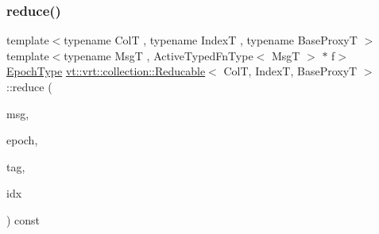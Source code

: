 \mbox{\label{structvt_1_1vrt_1_1collection_1_1_reducable_aac9bcd9f1bf69f13ab7b206580fc6969}} 
\subsubsection{\texorpdfstring{reduce()}{reduce()}\hspace{0.1cm}{\footnotesize\ttfamily [4/4]}}
{\footnotesize\ttfamily template$<$typename ColT , typename IndexT , typename Base\+ProxyT $>$ \\
template$<$typename MsgT , Active\+Typed\+Fn\+Type$<$ Msg\+T $>$ $\ast$ f$>$ \\
\hyperlink{namespacevt_a985a5adf291c34a3ca263b3378388236}{Epoch\+Type} \hyperlink{structvt_1_1vrt_1_1collection_1_1_reducable}{vt\+::vrt\+::collection\+::\+Reducable}$<$ ColT, IndexT, Base\+ProxyT $>$\+::reduce (\begin{DoxyParamCaption}\item[{MsgT $\ast$const}]{msg,  }\item[{\hyperlink{namespacevt_a985a5adf291c34a3ca263b3378388236}{Epoch\+Type} const \&}]{epoch,  }\item[{\hyperlink{namespacevt_a84ab281dae04a52a4b243d6bf62d0e52}{Tag\+Type} const \&}]{tag,  }\item[{IndexT const \&}]{idx }\end{DoxyParamCaption}) const}

\mbox{\label{structvt_1_1vrt_1_1collection_1_1_reducable_a431a1840392806c219759867e4d9516e}} 
